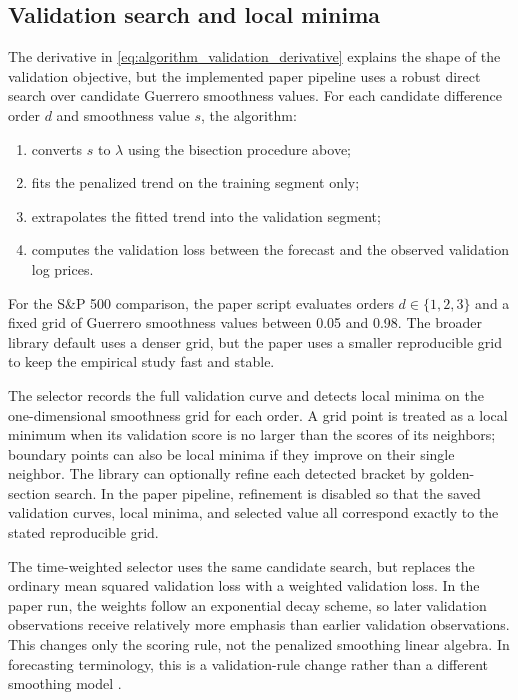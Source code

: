 \subsection{Validation search and local minima}
The derivative in \eqref{eq:algorithm_validation_derivative} explains the
shape of the validation objective, but the implemented paper pipeline uses a
robust direct search over candidate Guerrero smoothness values. For each
candidate difference order \(d\) and smoothness value \(s\), the algorithm:
\begin{enumerate}
  \item converts \(s\) to \(\lambda\) using the bisection procedure above;
  \item fits the penalized trend on the training segment only;
  \item extrapolates the fitted trend into the validation segment;
  \item computes the validation loss between the forecast and the observed
        validation log prices.
\end{enumerate}
For the S\&P 500 comparison, the paper script evaluates orders
\(d\in\{1,2,3\}\) and a fixed grid of Guerrero smoothness values between 0.05
and 0.98. The broader library default uses a denser grid, but the paper uses a
smaller reproducible grid to keep the empirical study fast and stable.

The selector records the full validation curve and detects local minima on the
one-dimensional smoothness grid for each order. A grid point is treated as a
local minimum when its validation score is no larger than the scores of its
neighbors; boundary points can also be local minima if they improve on their
single neighbor. The library can optionally refine each detected bracket by
golden-section search. In the paper pipeline, refinement is disabled so that the
saved validation curves, local minima, and selected value all correspond exactly
to the stated reproducible grid.

The time-weighted selector uses the same candidate search, but replaces the
ordinary mean squared validation loss with a weighted validation loss. In the
paper run, the weights follow an exponential decay scheme, so later validation
observations receive relatively more emphasis than earlier validation
observations. This changes only the scoring rule, not the penalized smoothing
linear algebra. In forecasting terminology, this is a validation-rule change
rather than a different smoothing model \citep{makridakis1998forecasting,
hyndman2008exponential}.

